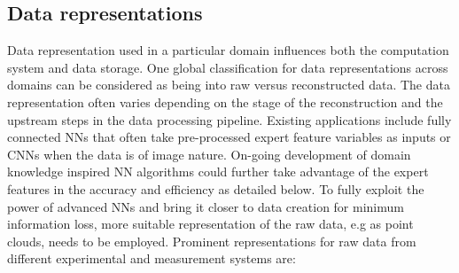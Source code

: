 \subsection{Data representations}
Data representation used in a particular domain influences both the computation system and data storage. One global classification for data representations across domains can be considered as being into raw versus reconstructed data. The data representation often varies depending on the stage of the reconstruction and the upstream steps in the data processing pipeline. Existing applications include fully connected NNs that often take pre-processed expert feature variables as inputs or CNNs when the data is of image nature. On-going development of domain knowledge inspired NN algorithms could further take advantage of the expert features in the accuracy and efficiency as detailed below.
To fully exploit the power of advanced NNs and bring it closer to data creation for minimum information loss, more suitable representation of the raw data, e.g as point clouds, needs to be employed. Prominent representations for raw data from different experimental and measurement systems are:

